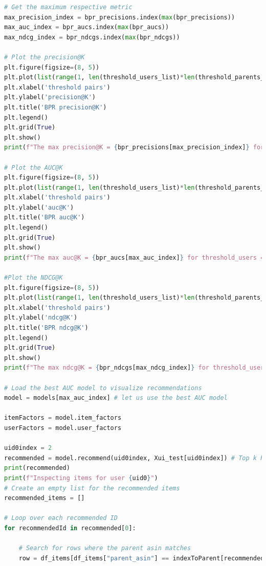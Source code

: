 \documentclass{article}
\begin{document}
\begin{lstlisting}[language=Python ]
# Get the maximum respective metric
max_precision_index = bpr_precisions.index(max(bpr_precisions))
max_auc_index = bpr_aucs.index(max(bpr_aucs))
max_ndcg_index = bpr_ndcgs.index(max(bpr_ndcgs))

# Plot the precision@K
plt.figure(figsize=(8, 5))
plt.plot(list(range(1, len(threshold_users_list)*len(threshold_parents_list) + 1)), bpr_precisions, marker='o', linestyle='-', color='b', label='y vs x')
plt.xlabel('threshold pairs')
plt.ylabel('precision@K')
plt.title('BPR precision@K')
plt.legend()
plt.grid(True)
plt.show()
print(f"The max precision@K = {bpr_precisions[max_precision_index]} for threshold_users = {threshold_pairs[max_precision_index][0]} and threshold_parents = {threshold_pairs[max_precision_index][1]}")

# Plot the AUC@K
plt.figure(figsize=(8, 5))
plt.plot(list(range(1, len(threshold_users_list)*len(threshold_parents_list) + 1)), bpr_aucs, marker='o', linestyle='-', color='b', label='y vs x')
plt.xlabel('threshold pairs')
plt.ylabel('auc@K')
plt.title('BPR auc@K')
plt.legend()
plt.grid(True)
plt.show()
print(f"The max auc@K = {bpr_aucs[max_auc_index]} for threshold_users = {threshold_pairs[max_auc_index][0]} and threshold_parents = {threshold_pairs[max_auc_index][1]}")

#Plot the NDCG@K
plt.figure(figsize=(8, 5))
plt.plot(list(range(1, len(threshold_users_list)*len(threshold_parents_list) + 1)), bpr_ndcgs, marker='o', linestyle='-', color='b', label='y vs x')
plt.xlabel('threshold pairs')
plt.ylabel('ndcg@K')
plt.title('BPR ndcg@K')
plt.legend()
plt.grid(True)
plt.show()
print(f"The max ndcg@K = {bpr_ndcgs[max_ndcg_index]} for threshold_users = {threshold_pairs[max_ndcg_index][0]} and threshold_parents = {threshold_pairs[max_ndcg_index][1]}")

# Load the best AUC model to visualize recommendations
model = models[max_auc_index] # let us use the best AUC model

itemFactors = model.item_factors
userFactors = model.user_factors

uid0index = 2
recommended = model.recommend(uid0index, Xui_test[uid0index]) # Top k Recommendations for the user
print(recommended)
print(f"Inspecting items for user {uid0}")
# Create an empty list for the recommended items
recommended_items = []

# Loop over each recommended ID
for recommendedId in recommended[0]:

    # Search for rows where the parent asin matches
    row = df_items[df_items["parent_asin"] == indexToParent[recommendedId]]


\end{lstlisting}
\end{document}
